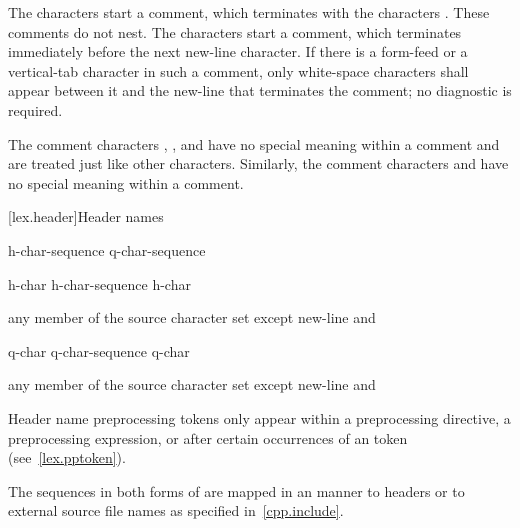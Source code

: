 \pnum
{}%
%
%
The characters \tcode{/*} start a comment, which terminates with the
characters \tcode{*/}. These comments do not nest.
%
The characters \tcode{//} start a comment, which terminates immediately before the
next new-line character. If there is a form-feed or a vertical-tab
character in such a comment, only white-space characters shall appear
between it and the new-line that terminates the comment; no diagnostic
is required.
\begin{note}
The comment characters \tcode{//}, \tcode{/*},
and \tcode{*/} have no special meaning within a \tcode{//} comment and
are treated just like other characters. Similarly, the comment
characters \tcode{//} and \tcode{/*} have no special meaning within a
\tcode{/*} comment.
\end{note}

[lex.header]{Header names}

%
\begin{bnf}
\br
    \terminal{<} h-char-sequence \terminal{>}\br
     q-char-sequence 
\end{bnf}

\begin{bnf}
\br
    h-char\br
    h-char-sequence h-char
\end{bnf}

\begin{bnf}
\br
    \textnormal{any member of the source character set except new-line and \terminal{>}}
\end{bnf}

\begin{bnf}
\br
    q-char\br
    q-char-sequence q-char
\end{bnf}

\begin{bnf}
\br
    \textnormal{any member of the source character set except new-line and }
\end{bnf}

\pnum
\begin{note}
Header name preprocessing tokens only appear within
a  preprocessing directive,
a  preprocessing expression, or
after certain occurrences of an  token
(see~\ref{lex.pptoken}).
\end{note}
The sequences in both forms of  are mapped in an
 manner to headers or to
external source file names as specified in~\ref{cpp.include}.


